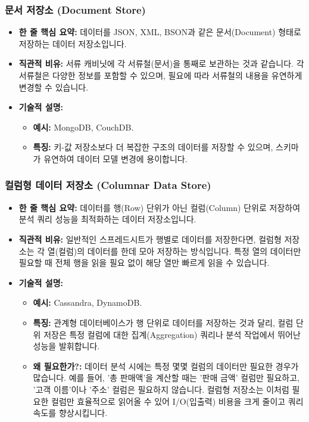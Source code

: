 \documentclass[11pt,a4paper]{article}
\begin{document}
\subsubsection{문서 저장소 (Document Store)}
\begin{itemize}
    \item \textbf{한 줄 핵심 요약:} 데이터를 JSON, XML, BSON과 같은 문서(Document) 형태로 저장하는 데이터 저장소입니다.
    \item \textbf{직관적 비유:} 서류 캐비닛에 각 서류철(문서)을 통째로 보관하는 것과 같습니다. 각 서류철은 다양한 정보를 포함할 수 있으며, 필요에 따라 서류철의 내용을 유연하게 변경할 수 있습니다.
    \item \textbf{기술적 설명:}
    \begin{itemize}
        \item \textbf{예시:} MongoDB, CouchDB.
        \item \textbf{특징:} 키-값 저장소보다 더 복잡한 구조의 데이터를 저장할 수 있으며, 스키마가 유연하여 데이터 모델 변경에 용이합니다.
    \end{itemize}
\end{itemize}

\subsubsection{컬럼형 데이터 저장소 (Columnar Data Store)}
\begin{itemize}
    \item \textbf{한 줄 핵심 요약:} 데이터를 행(Row) 단위가 아닌 컬럼(Column) 단위로 저장하여 분석 쿼리 성능을 최적화하는 데이터 저장소입니다.
    \item \textbf{직관적 비유:} 일반적인 스프레드시트가 행별로 데이터를 저장한다면, 컬럼형 저장소는 각 열(컬럼)의 데이터를 한데 모아 저장하는 방식입니다. 특정 열의 데이터만 필요할 때 전체 행을 읽을 필요 없이 해당 열만 빠르게 읽을 수 있습니다.
    \item \textbf{기술적 설명:}
    \begin{itemize}
        \item \textbf{예시:} Cassandra, DynamoDB.
        \item \textbf{특징:} 관계형 데이터베이스가 행 단위로 데이터를 저장하는 것과 달리, 컬럼 단위 저장은 특정 컬럼에 대한 집계(Aggregation) 쿼리나 분석 작업에서 뛰어난 성능을 발휘합니다.
    \item \textbf{왜 필요한가?:} 데이터 분석 시에는 특정 몇몇 컬럼의 데이터만 필요한 경우가 많습니다. 예를 들어, '총 판매액'을 계산할 때는 '판매 금액' 컬럼만 필요하고, '고객 이름'이나 '주소' 컬럼은 필요하지 않습니다. 컬럼형 저장소는 이처럼 필요한 컬럼만 효율적으로 읽어올 수 있어 I/O(입출력) 비용을 크게 줄이고 쿼리 속도를 향상시킵니다.
    \end{itemize}
\end{itemize}
\end{document}
